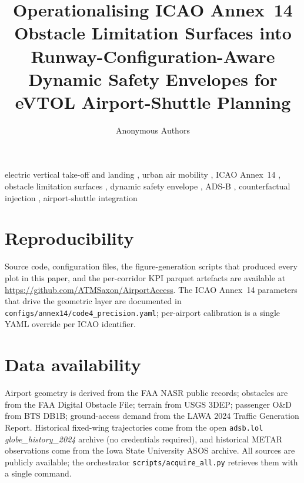 \documentclass[3p,times,sort&compress,authoryear,review]{elsarticle}
\begin{document}
\begin{frontmatter}

\title{Operationalising ICAO Annex~14 Obstacle Limitation Surfaces into Runway-Configuration-Aware Dynamic Safety Envelopes for eVTOL Airport-Shuttle Planning}

\author{Anonymous Authors}
\address{Anonymous Affiliations}



\begin{keyword}
electric vertical take-off and landing \sep
urban air mobility \sep
ICAO Annex~14 \sep
obstacle limitation surfaces \sep
dynamic safety envelope \sep
ADS-B \sep
counterfactual injection \sep
airport-shuttle integration
\end{keyword}

\end{frontmatter}










\section*{Reproducibility}
\label{sec:repro}
Source code, configuration files, the figure-generation scripts that produced
every plot in this paper, and the per-corridor KPI parquet artefacts are available
at \url{https://github.com/ATMSaxon/AirportAccess}. The ICAO Annex~14 parameters
that drive the geometric layer are documented in
\texttt{configs/annex14/code4\_precision.yaml}; per-airport calibration is a
single YAML override per ICAO identifier.

\section*{Data availability}
\label{sec:data-avail}
Airport geometry is derived from the FAA NASR public records; obstacles are from
the FAA Digital Obstacle File; terrain from USGS 3DEP; passenger O\&D from
BTS DB1B; ground-access demand from the LAWA 2024 Traffic Generation Report.
Historical fixed-wing trajectories come from the open
\texttt{adsb.lol} \emph{globe\_history\_2024} archive (no credentials required),
and historical METAR observations come from the Iowa State University ASOS
archive. All sources are publicly available; the orchestrator
\texttt{scripts/acquire\_all.py} retrieves them with a single command.
\end{document}
